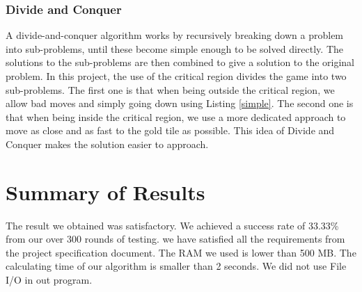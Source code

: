 \documentclass[12pt,twoside,letterpaper]{article}
\begin{document}
\subsubsection{Divide and Conquer}
A divide-and-conquer algorithm works by recursively breaking down a problem into sub-problems, until these become simple enough to be solved directly. The solutions to the sub-problems are then combined to give a solution to the original problem. In this project, the use of the critical region divides the game into two sub-problems. The first one is that when being outside the critical region, we allow bad moves and simply going down using Listing \ref{simple}. The second one is that when being inside the critical region, we use a more dedicated approach to move as close and as fast to the gold tile as possible. This idea of Divide and Conquer makes the solution easier to approach.

\section{Summary of Results}
The result we obtained was satisfactory. We achieved a success rate of 33.33\% from our over 300 rounds of testing. we have satisfied all the requirements from the project specification document. The RAM we used is lower than 500 MB. The calculating time of our algorithm is smaller than 2 seconds. We did not use File I/O in out program.
\end{document}
